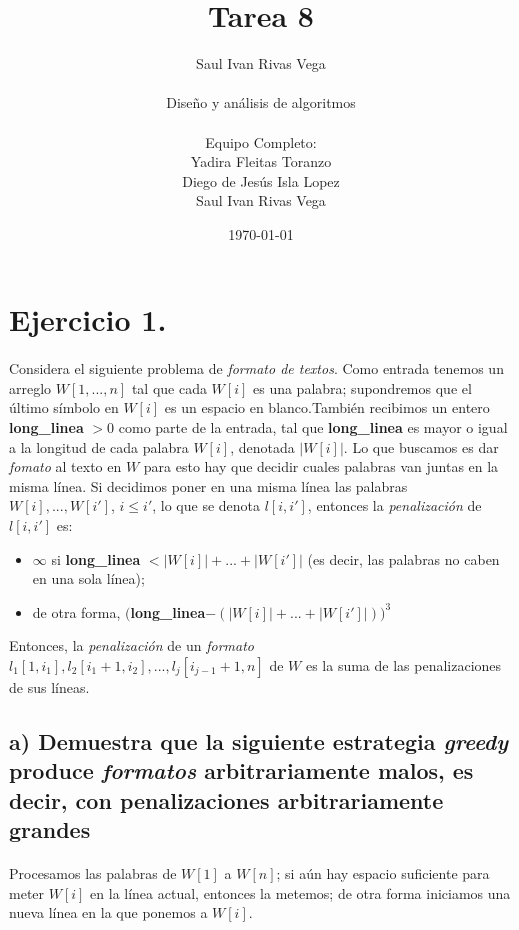 \documentclass[12pt]{article}
\title{Tarea 8}
\author{
	Saul Ivan Rivas Vega \\
	\\
	Diseño y análisis de algoritmos\\
\\
	Equipo Completo:\\
		Yadira Fleitas Toranzo\\
		Diego de Jesús Isla Lopez\\
		Saul Ivan Rivas Vega\\
}
\date{\today}
\begin{document}
	\maketitle
	\pagebreak
	\section{Ejercicio 1.}
	\paragraph{} Considera el siguiente problema de \textit{formato de textos}. Como entrada tenemos un arreglo $W[1,...,n]$ tal que cada $W[i]$ es una palabra; supondremos que el último símbolo en $W[i]$ es un espacio en blanco.También recibimos un entero \textbf{long\_linea} $> 0$ como parte de la entrada, tal que \textbf{long\_linea} es mayor o igual a la longitud de cada palabra $W[i]$, denotada $|W[i]|$. Lo que buscamos es dar \textit{fomato} al texto en $W$ para esto hay que decidir cuales palabras van juntas en la misma línea. Si decidimos poner en una misma línea las palabras $W[i],...,W[i']$, $i\leq i'$, lo que se denota $l[i,i']$, entonces la \textit{penalización} de $l[i,i']$ es:
	\begin{itemize}
		\item $\infty$ si \textbf{long\_linea} $< |W[i]| + ... + |W[i']|$ (es decir, las palabras no caben en una sola línea);
		\item de otra forma, $($\textbf{long\_linea}$-(|W[i]| + ... + |W[i']|))^3$
	\end{itemize}
	Entonces, la \textit{penalización} de un \textit{formato} $l_1[1,i_1], l_2[i_1+1, i_2], ..., l_j[i_{j-1}+1, n]$ de $W$ es la suma de las penalizaciones de sus líneas.
	 \\
	 \subsection{a) Demuestra que la siguiente estrategia \textit{greedy} produce \textit{formatos} arbitrariamente malos, es decir, con penalizaciones arbitrariamente grandes}
	 \paragraph{}Procesamos las palabras de $W[1]$ a $W[n]$; si aún hay espacio suficiente para meter $W[i]$ en la línea actual, entonces la metemos; de otra forma iniciamos una nueva línea en la que ponemos a $W[i]$.
\end{document}

